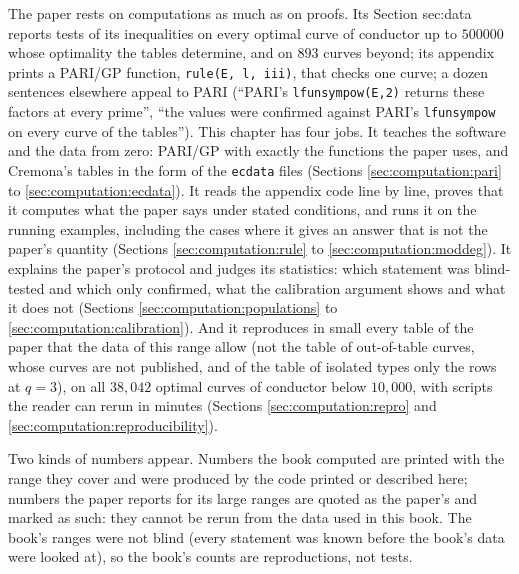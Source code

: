 \begin{sloppypar}
The paper rests on computations as much as on proofs. Its Section sec:data reports tests of its inequalities on every optimal curve of conductor up to $500000$ whose
optimality the tables determine, and on $893$ curves beyond; its appendix prints a PARI/GP function, \texttt{rule(E, l, iii)}, that checks one curve; a dozen sentences elsewhere appeal to
PARI (``PARI's \texttt{lfunsympow(E,2)} returns these factors at every prime'', ``the values were confirmed against PARI's
\texttt{lfunsympow} on every curve of the tables''). This chapter has four jobs. It teaches the software and the data from zero: PARI/GP
with exactly the functions the paper uses, and Cremona's tables in the form of the \texttt{ecdata} files (Sections
\ref{sec:computation:pari} to \ref{sec:computation:ecdata}). It reads the appendix code line by line, proves that it computes what the paper
says under stated conditions, and runs it on the running examples, including the cases where it gives an answer that is not the paper's
quantity (Sections \ref{sec:computation:rule} to \ref{sec:computation:moddeg}). It explains the paper's protocol and judges its statistics:
which statement was blind-tested and which only confirmed, what the calibration argument shows and what it does not
(Sections \ref{sec:computation:populations} to \ref{sec:computation:calibration}). And it reproduces in small every table of the paper that the data of this range allow (not the table of
out-of-table curves, whose curves are not published, and of the table of isolated types only the rows at $q=3$), on all
$38{,}042$ optimal curves of conductor below $10{,}000$, with scripts the reader can rerun in minutes (Sections \ref{sec:computation:repro}
and \ref{sec:computation:reproducibility}).

Two kinds of numbers appear. Numbers the book computed are printed with the range they cover and were produced by the code printed or
described here; numbers the paper reports for its large ranges are quoted as the paper's and marked as such: they cannot be rerun from the
data used in this book. The book's ranges were not blind (every statement was known before the book's data were looked at), so the book's
counts are reproductions, not tests.


\end{sloppypar}
